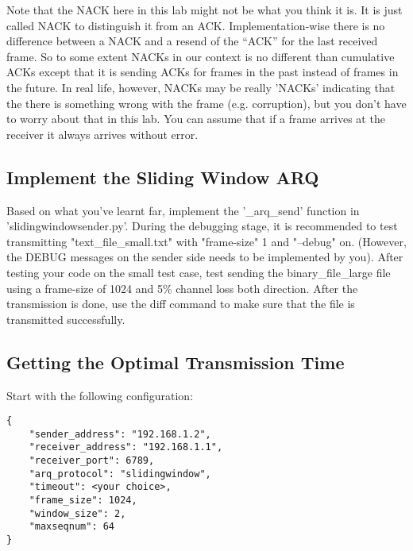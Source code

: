 \documentclass[11pt]{article}
\begin{document}
\noindent Note that the NACK here in this lab might not be what you think it is. It is just called NACK to distinguish it from an ACK. Implementation-wise there is no difference between a NACK and a resend
of the ``ACK'' for the last received frame. So to some extent NACKs in our context is no different than cumulative ACKs except that it is sending ACKs for frames in the past instead of frames in the future.
In real life, however, NACKs may be really 'NACKs' indicating that the there is something wrong with the frame (e.g. corruption), but you don't have to worry about that in this lab. You can assume that
if a  frame arrives at the receiver it always arrives without error.


\subsection{Implement the Sliding Window ARQ}
Based on what you've learnt far, implement the '\_arq\_send' function in 'slidingwindowsender.py'. During the debugging stage, it is recommended to test transmitting "text\_file\_small.txt" with "frame-size" 1 and "--debug" on. (However, the DEBUG messages on the sender side needs to be implemented by you). After testing your code on the small test case, test sending the binary\_file\_large file using a frame-size of 1024 and 5\% channel loss both direction. After the transmission is done, use the diff command to make sure that the file is transmitted successfully.



\subsection{Getting the Optimal Transmission Time}

Start with the following configuration:
\begin{lstlisting}[caption={Sliding Window Configuration}]
{
    "sender_address": "192.168.1.2",
    "receiver_address": "192.168.1.1",
    "receiver_port": 6789,
    "arq_protocol": "slidingwindow",
    "timeout": <your choice>,
    "frame_size": 1024,
    "window_size": 2,
    "maxseqnum": 64
}
\end{lstlisting}
\end{document}
